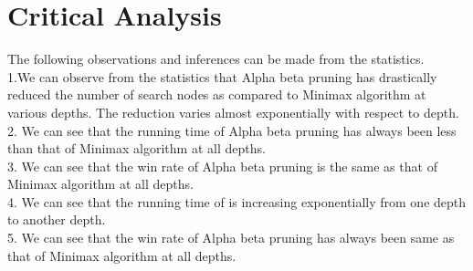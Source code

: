 \documentclass[11pt]{article}
\begin{document}
  
\section{  Critical Analysis }



The following observations and inferences can be made from the statistics.\\
1.We can observe from the statistics that Alpha beta pruning has  drastically reduced the number of search nodes as compared to Minimax algorithm  at various depths. The reduction varies almost exponentially with respect to depth. \\
2. We can see that  the running time of   Alpha beta pruning has always been less than that of Minimax algorithm at all depths.\\
3. We can see that  the win rate  of   Alpha beta pruning is the same as that of Minimax algorithm at all depths.\\
4. We can see that  the running time of is increasing exponentially from one depth to another depth.\\
5. We can see that  the win rate of   Alpha beta pruning has always been same as that of  Minimax algorithm at all depths.\\
\end{document}

